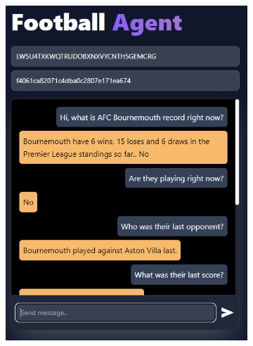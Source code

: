 \documentclass[10pt,a4paper,twocolumn]{article}
\begin{document}
\begin{figure}
    \centering
    \begin{subfigure}[b]{0.48\textwidth}
        \centering
        \includegraphics[width=\textwidth]{assets/Screenshot_5.png}
    \end{subfigure}
    \hfill
    \begin{subfigure}[b]{0.47\textwidth}
        \centering

\end{subfigure}
\end{figure}
\end{document}
